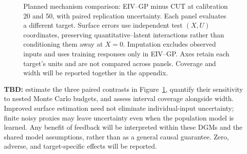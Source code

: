 \begin{figure}[!htbp]
\centering\small
{}\hfill
{}\hfill
{}
\caption{Planned mechanism comparison: EIV--GP minus CUT at calibration 20 and 50, with paired replication uncertainty. Each panel evaluates a different target. Surface errors use independent test $(X,U)$ coordinates, preserving quantitative--latent interactions rather than conditioning them away at $X=0$. Imputation excludes observed inputs and uses training responses only in EIV--GP. Axes retain each target's units and are not compared across panels. Coverage and width will be reported together in the appendix.}
\label{fig:numerical-feedback}
\end{figure}

\textbf{TBD:} estimate the three paired contrasts in Figure~\ref{fig:numerical-feedback}, quantify their sensitivity to nested Monte Carlo budgets, and assess interval coverage alongside width. Improved surface estimation need not eliminate individual-input uncertainty; finite noisy proxies may leave uncertainty even when the population model is learned. Any benefit of feedback will be interpreted within these DGMs and the shared model assumptions, rather than as a general causal guarantee. Zero, adverse, and target-specific effects will be reported.

